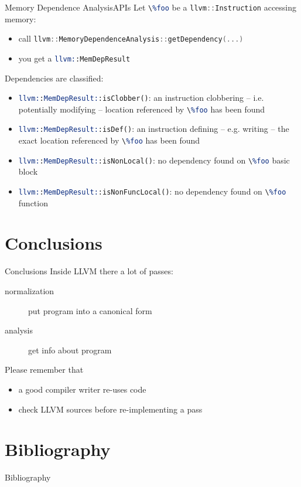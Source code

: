 \documentclass[10pt,mathserif]{beamer}
\newcommand{\cppinline}[1]{\lstinline[language=C++]!#1!}
\newcommand{\llvminline}[1]{\lstinline[language=LLVM]!#1!}
\begin{document}
\begin{frame}{Memory Dependence Analysis}{APIs}
Let \llvminline{\%foo} be a \cppinline{llvm::Instruction} accessing memory:

\begin{itemize}
\item call \cppinline{llvm::MemoryDependenceAnalysis::getDependency(...)}
\item you get a \llvminline{llvm::MemDepResult}
\end{itemize}

Dependencies are classified:

\begin{itemize}
\item \llvminline{llvm::MemDepResult::isClobber()}: an instruction clobbering --
      i.e. potentially modifying -- location referenced by \llvminline{\%foo}
      has been found
\item \llvminline{llvm::MemDepResult::isDef()}: an instruction defining -- e.g.
      writing -- the exact location referenced by \llvminline{\%foo} has been
      found
\item \llvminline{llvm::MemDepResult::isNonLocal()}: no dependency found on
      \llvminline{\%foo} basic block
\item \llvminline{llvm::MemDepResult::isNonFuncLocal()}: no dependency found on
      \llvminline{\%foo} function
\end{itemize}
\end{frame}

\section{Conclusions}
\begin{frame}{Conclusions}
Inside LLVM there a lot of passes:

\begin{description}
\item[normalization] put program into a canonical form
\item[analysis] get info about program
\end{description}

Please remember that

\begin{itemize}
\item a good compiler writer \alert{re-uses} code
\item check LLVM sources before re-implementing a pass
\end{itemize}
\end{frame}

\section{Bibliography}
\begin{frame}[allowframebreaks]{Bibliography}
\nocite{*}


\end{frame}
\end{document}
